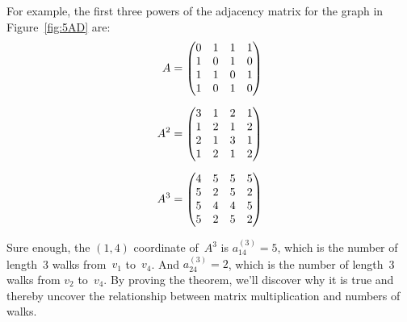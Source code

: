 For example, the first three powers of the adjacency matrix for the
graph in Figure~\ref{fig:5AD} are:
\begin{align*}
    A &= \begin{pmatrix}
            0 & 1 & 1 & 1 \\
            1 & 0 & 1 & 0 \\
            1 & 1 & 0 & 1 \\
            1 & 0 & 1 & 0
         \end{pmatrix} \\[\medskipamount]
  A^2 &= \begin{pmatrix}
            3 & 1 & 2 & 1 \\
            1 & 2 & 1 & 2 \\
            2 & 1 & 3 & 1 \\
            1 & 2 & 1 & 2
         \end{pmatrix} \\[\medskipamount]
  A^3 &= \begin{pmatrix}
            4 & 5 & 5 & 5 \\
            5 & 2 & 5 & 2 \\
            5 & 4 & 4 & 5 \\
            5 & 2 & 5 & 2
         \end{pmatrix}
\end{align*}

Sure enough, the $(1, 4)$ coordinate of~$A^3$ is $a_{14}^{(3)} = 5$,
which is the number of length~3 walks from~$v_1$ to~$v_4$.  And
$a_{24}^{(3)} = 2$, which is the number of length~3 walks from $v_2$
to~$v_4$.  By proving the theorem, we'll discover why it is true and
thereby uncover the relationship between matrix multiplication and
numbers of walks.

